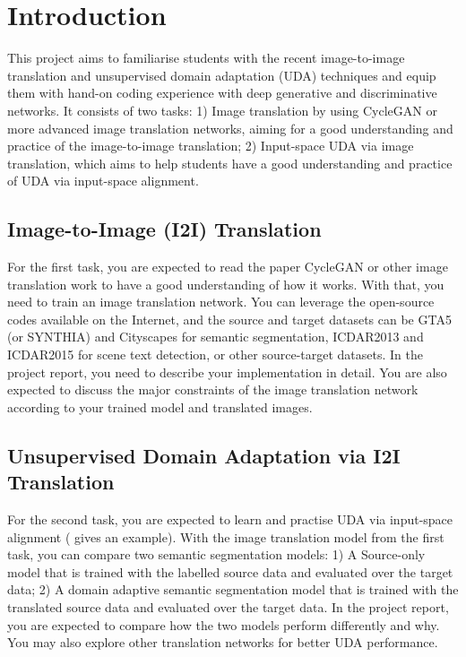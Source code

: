 \section{Introduction}
This project aims to familiarise students with the recent image-to-image translation and unsupervised domain adaptation (UDA) techniques and equip them with hand-on coding experience with deep generative and discriminative networks. It consists of two tasks: 1) Image translation by using CycleGAN or more advanced image translation networks, aiming for a good understanding and practice of the image-to-image translation; 2) Input-space UDA via image translation, which aims to help students have a good understanding and practice of UDA via input-space alignment.

\subsection{Image-to-Image (I2I) Translation}
For the first task, you are expected to read the paper CycleGAN or other image translation work to have a good understanding of how it works. With that, you need to train an image translation network. You can leverage the open-source codes available on the Internet, and the source and target datasets can be GTA5 (or SYNTHIA) and Cityscapes for semantic segmentation, ICDAR2013 and ICDAR2015 for scene text detection, or other source-target datasets. In the project report, you need to describe your implementation in detail. You are also expected to discuss the major constraints of the image translation network according to your trained model and translated images.

\subsection{Unsupervised Domain Adaptation via I2I Translation}
For the second task, you are expected to learn and practise UDA via input-space alignment (\cite{cycada} gives an example). With the image translation model from the first task, you can compare two semantic segmentation models: 1) A Source-only model that is trained with the labelled source data and evaluated over the target data; 2) A domain adaptive semantic segmentation model that is trained with the translated source data and evaluated over the target data. In the project report, you are expected to compare how the two models perform differently and why. You may also explore other translation networks for better UDA performance.

\newpage